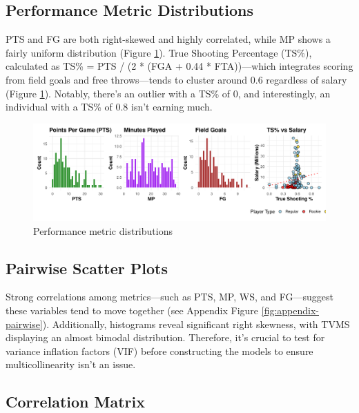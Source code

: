 \documentclass[
  11pt,
]{article}
\begin{document}
\hypertarget{performance-metric-distributions}{%
\subsection{Performance Metric Distributions}\label{performance-metric-distributions}}

PTS and FG are both right-skewed and highly correlated, while MP shows a fairly uniform distribution (Figure \ref{fig:performance-dist}). True Shooting Percentage (TS\%), calculated as TS\% = PTS / (2 * (FGA + 0.44 * FTA))---which integrates scoring from field goals and free throws---tends to cluster around 0.6 regardless of salary (Figure \ref{fig:performance-dist}). Notably, there's an outlier with a TS\% of 0, and interestingly, an individual with a TS\% of 0.8 isn't earning much.

\begin{figure}
\centering
\includegraphics{lab2_report_short_files/figure-latex/performance-dist-1.pdf}
\caption{\label{fig:performance-dist}Performance metric distributions}
\end{figure}

\hypertarget{pairwise-scatter-plots}{%
\subsection{Pairwise Scatter Plots}\label{pairwise-scatter-plots}}

Strong correlations among metrics---such as PTS, MP, WS, and FG---suggest these variables tend to move together (see Appendix Figure \ref{fig:appendix-pairwise}). Additionally, histograms reveal significant right skewness, with TVMS displaying an almost bimodal distribution. Therefore, it's crucial to test for variance inflation factors (VIF) before constructing the models to ensure multicollinearity isn't an issue.

\hypertarget{correlation-matrix}{%
\subsection{Correlation Matrix}\label{correlation-matrix}}
\end{document}
